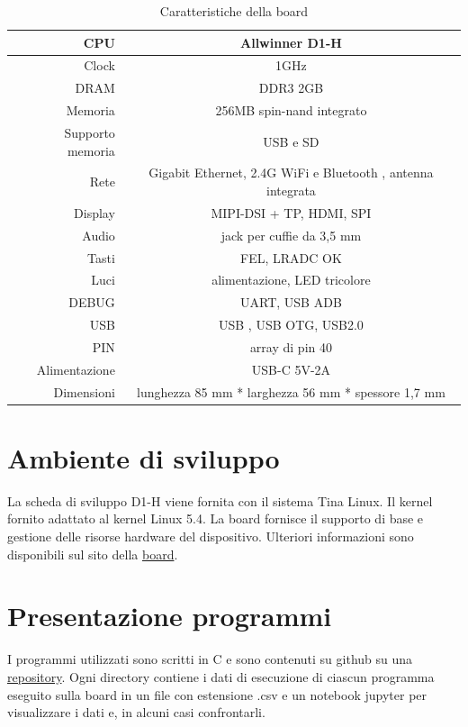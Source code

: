\documentclass[12pt,a4paper]{report}
\begin{document}
\vspace{2cm}
\begin{table}[h!]
\centering
\begin{tabular}{|r|c|}
\hline
CPU & Allwinner D1-H \\
\hline
Clock & 1GHz\\
\hline
DRAM & DDR3 2GB\\
\hline
Memoria & 256MB  spin-nand integrato\\
\hline 
Supporto memoria & USB e  SD\\
\hline
Rete & Gigabit Ethernet,  2.4G WiFi e Bluetooth , antenna integrata\\
\hline
Display & MIPI-DSI + TP, HDMI, SPI \\
\hline
Audio & jack per cuffie da 3,5 mm\\
\hline
Tasti & FEL, LRADC OK\\
\hline
Luci &  alimentazione, LED tricolore\\
\hline
DEBUG & UART, USB ADB\\
\hline
USB & USB , USB OTG, USB2.0\\
\hline
PIN & array di pin 40\\
\hline
Alimentazione & USB-C  5V-2A\\
\hline
Dimensioni & lunghezza 85 mm * larghezza 56 mm * spessore 1,7 mm\\
\hline

\end{tabular}
\caption{Caratteristiche della board}
\end{table}

\section{Ambiente di sviluppo}
La scheda di sviluppo D1-H viene fornita con il sistema Tina Linux. Il kernel fornito  adattato al kernel Linux 5.4. La board fornisce il supporto di base e gestione delle risorse hardware del dispositivo. Ulteriori informazioni sono disponibili sul sito della \href{https://d1.docs.aw-ol.com/study/study_1tina/}{board}.

\section{Presentazione programmi}
I programmi utilizzati sono scritti in C e sono contenuti su github su una \href{https://github.com/MattiaBianchessi/Testing_RISC-V}{repository}.
 Ogni directory contiene i dati di esecuzione di ciascun programma eseguito sulla board in un file con estensione .csv e un notebook jupyter per visualizzare i dati e, in alcuni casi confrontarli.
\end{document}
